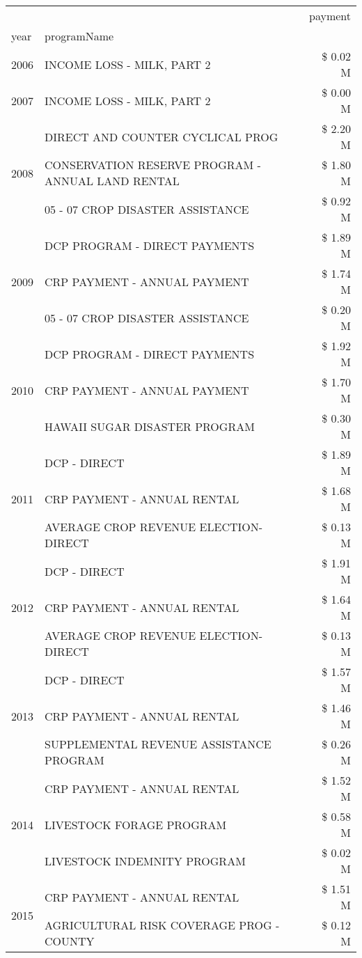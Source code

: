 \begin{tabular}{llr}
\toprule
 &  & payment \\
year & programName &  \\
\midrule
2006 & INCOME LOSS - MILK, PART 2 & \$ 0.02 M \\
\cline{1-3}
2007 & INCOME LOSS - MILK, PART 2 & \$ 0.00 M \\
\cline{1-3}
\multirow[t]{3}{*}{2008} & DIRECT AND COUNTER CYCLICAL PROG & \$ 2.20 M \\
 & CONSERVATION RESERVE PROGRAM - ANNUAL LAND RENTAL & \$ 1.80 M \\
 & 05 - 07 CROP DISASTER ASSISTANCE & \$ 0.92 M \\
\cline{1-3}
\multirow[t]{3}{*}{2009} & DCP PROGRAM - DIRECT PAYMENTS & \$ 1.89 M \\
 & CRP PAYMENT - ANNUAL PAYMENT & \$ 1.74 M \\
 & 05 - 07 CROP DISASTER ASSISTANCE & \$ 0.20 M \\
\cline{1-3}
\multirow[t]{3}{*}{2010} & DCP PROGRAM - DIRECT PAYMENTS & \$ 1.92 M \\
 & CRP PAYMENT - ANNUAL PAYMENT & \$ 1.70 M \\
 & HAWAII SUGAR DISASTER PROGRAM & \$ 0.30 M \\
\cline{1-3}
\multirow[t]{3}{*}{2011} & DCP - DIRECT & \$ 1.89 M \\
 & CRP PAYMENT - ANNUAL RENTAL & \$ 1.68 M \\
 & AVERAGE CROP REVENUE ELECTION-DIRECT & \$ 0.13 M \\
\cline{1-3}
\multirow[t]{3}{*}{2012} & DCP - DIRECT & \$ 1.91 M \\
 & CRP PAYMENT - ANNUAL RENTAL & \$ 1.64 M \\
 & AVERAGE CROP REVENUE ELECTION-DIRECT & \$ 0.13 M \\
\cline{1-3}
\multirow[t]{3}{*}{2013} & DCP - DIRECT & \$ 1.57 M \\
 & CRP PAYMENT - ANNUAL RENTAL & \$ 1.46 M \\
 & SUPPLEMENTAL REVENUE ASSISTANCE PROGRAM & \$ 0.26 M \\
\cline{1-3}
\multirow[t]{3}{*}{2014} & CRP PAYMENT - ANNUAL RENTAL & \$ 1.52 M \\
 & LIVESTOCK FORAGE PROGRAM & \$ 0.58 M \\
 & LIVESTOCK INDEMNITY PROGRAM & \$ 0.02 M \\
\cline{1-3}
\multirow[t]{3}{*}{2015} & CRP PAYMENT - ANNUAL RENTAL & \$ 1.51 M \\
 & AGRICULTURAL RISK COVERAGE PROG - COUNTY & \$ 0.12 M \\

\end{tabular}
